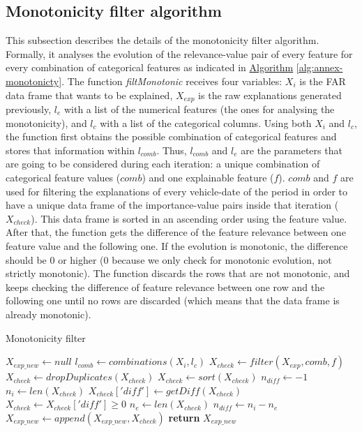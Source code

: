 \subsection{Monotonicity filter algorithm}\label{subsec:annex-monotonicity}
This subsection describes the details of the monotonicity filter algorithm.
Formally, it analyses the evolution of the relevance-value pair of every feature for every combination of categorical features as indicated in \hyperref[alg:annex-monotonicty]{Algorithm} \ref{alg:annex-monotonicty}. The function \textit{filtMonotonic} receives four variables: $X_{i}$ is the FAR data frame that wants to be explained, $X_{exp}$ is the raw explanations generated previously, $l_e$ with a list of the numerical features (the ones for analysing the monotonicity), and $l_c$ with a list of the categorical columns. Using both $X_{i}$ and $l_{c}$, the function first obtains the possible combination of categorical features and stores that information within $l_{comb}$. Thus, $l_{comb}$ and $l_e$ are the parameters that are going to be considered during each iteration: a unique combination of categorical feature values ($comb$) and one explainable feature ($f$). $comb$ and $f$ are used for filtering the explanations of every vehicle-date of the period in order to have a unique data frame of the importance-value pairs inside that iteration ($X_{check}$). This data frame is sorted in an ascending order using the feature value.
After that, the function gets the difference of the feature relevance between one feature value and the following one. If the evolution is monotonic, the difference should be 0 or higher (0 because we only check for monotonic evolution, not strictly monotonic). The function discards the rows that are not monotonic, and keeps checking the difference of feature relevance between one row and the following one until no rows are discarded (which means that the data frame is already monotonic).

\begin{algorithm}[h!]
\caption{Monotonicity filter}\label{alg:annex-monotonicty}
\begin{algorithmic}[1]
    \State $X_{exp\_new} \gets null$
    \State $l_{comb} \gets combinations(X_{i}, l_c)$
            \State $X_{check} \gets filter(X_{exp}, comb, f)$
            \State $X_{check} \gets dropDuplicates(X_{check})$
            \State $X_{check} \gets sort(X_{check})$
            \State $n_{diff} \gets -1$
                \State $n_{i} \gets len(X_{check})$
                \State $X_{check}['diff'] \gets getDiff(X_{check})$
                \State $X_{check} \gets X_{check}['diff'] \geq 0$
                \State $n_{e} \gets len(X_{check})$
                \State $n_{diff} \gets n_{i} - n_{e}$
            \EndWhile
            \State $X_{exp\_new} \gets append(X_{exp\_new}, X_{check})$
        \EndFor
    \EndFor
    \State \textbf{return} $X_{exp\_new}$
\EndProcedure
\end{algorithmic}
\end{algorithm}

